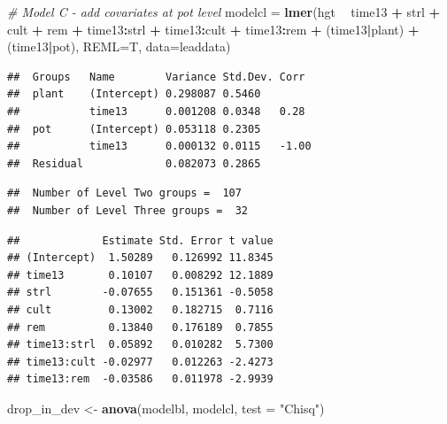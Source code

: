 \documentclass[
]{krantz}
\newenvironment{Shaded}{\begin{snugshade}}{\end{snugshade}}
\newcommand{\CommentTok}[1]{\textcolor[rgb]{0.37,0.37,0.37}{\textit{#1}}}
\newcommand{\DataTypeTok}[1]{\textcolor[rgb]{0.27,0.27,0.27}{#1}}
\newcommand{\KeywordTok}[1]{\textcolor[rgb]{0.27,0.27,0.27}{\textbf{#1}}}
\newcommand{\NormalTok}[1]{#1}
\newcommand{\OperatorTok}[1]{\textcolor[rgb]{0.43,0.43,0.43}{\textbf{#1}}}
\newcommand{\StringTok}[1]{\textcolor[rgb]{0.5,0.5,0.5}{#1}}
\begin{document}
\begin{Shaded}
\begin{Highlighting}[]
\CommentTok{# Model C - add covariates at pot level}
\NormalTok{modelcl =}\StringTok{ }\KeywordTok{lmer}\NormalTok{(hgt }\OperatorTok{~}\StringTok{ }\NormalTok{time13 }\OperatorTok{+}\StringTok{ }\NormalTok{strl }\OperatorTok{+}\StringTok{ }\NormalTok{cult }\OperatorTok{+}\StringTok{ }\NormalTok{rem }\OperatorTok{+}\StringTok{ }
\StringTok{    }\NormalTok{time13}\OperatorTok{:}\NormalTok{strl }\OperatorTok{+}\StringTok{ }\NormalTok{time13}\OperatorTok{:}\NormalTok{cult }\OperatorTok{+}\StringTok{ }\NormalTok{time13}\OperatorTok{:}\NormalTok{rem }\OperatorTok{+}\StringTok{ }\NormalTok{(time13}\OperatorTok{|}\NormalTok{plant) }\OperatorTok{+}
\StringTok{    }\NormalTok{(time13}\OperatorTok{|}\NormalTok{pot), }\DataTypeTok{REML=}\NormalTok{T, }\DataTypeTok{data=}\NormalTok{leaddata)}
\end{Highlighting}
\end{Shaded}

\begin{verbatim}
##  Groups   Name        Variance Std.Dev. Corr 
##  plant    (Intercept) 0.298087 0.5460        
##           time13      0.001208 0.0348   0.28 
##  pot      (Intercept) 0.053118 0.2305        
##           time13      0.000132 0.0115   -1.00
##  Residual             0.082073 0.2865
\end{verbatim}

\begin{verbatim}
##  Number of Level Two groups =  107 
##  Number of Level Three groups =  32
\end{verbatim}

\begin{verbatim}
##             Estimate Std. Error t value
## (Intercept)  1.50289   0.126992 11.8345
## time13       0.10107   0.008292 12.1889
## strl        -0.07655   0.151361 -0.5058
## cult         0.13002   0.182715  0.7116
## rem          0.13840   0.176189  0.7855
## time13:strl  0.05892   0.010282  5.7300
## time13:cult -0.02977   0.012263 -2.4273
## time13:rem  -0.03586   0.011978 -2.9939
\end{verbatim}

\begin{Shaded}
\begin{Highlighting}[]
\NormalTok{drop_in_dev <-}\StringTok{ }\KeywordTok{anova}\NormalTok{(modelbl, modelcl, }\DataTypeTok{test =} \StringTok{"Chisq"}\NormalTok{)}
\end{Highlighting}
\end{Shaded}
\end{document}
